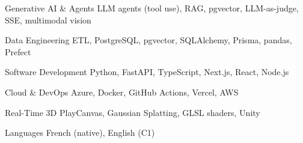 


\begin{cvskills}


\cvskill
{Generative AI \& Agents}
{LLM agents (tool use), RAG, pgvector, LLM-as-judge, SSE, multimodal vision}


\cvskill
{Data Engineering}
{ETL, PostgreSQL, pgvector, SQLAlchemy, Prisma, pandas, Prefect}


\cvskill
{Software Development}
{Python, FastAPI, TypeScript, Next.js, React, Node.js}


\cvskill
{Cloud \& DevOps}
{Azure, Docker, GitHub Actions, Vercel, AWS}


\cvskill
{Real-Time 3D}
{PlayCanvas, Gaussian Splatting, GLSL shaders, Unity}


\cvskill
{Languages}
{French (native), English (C1)}


\end{cvskills}
